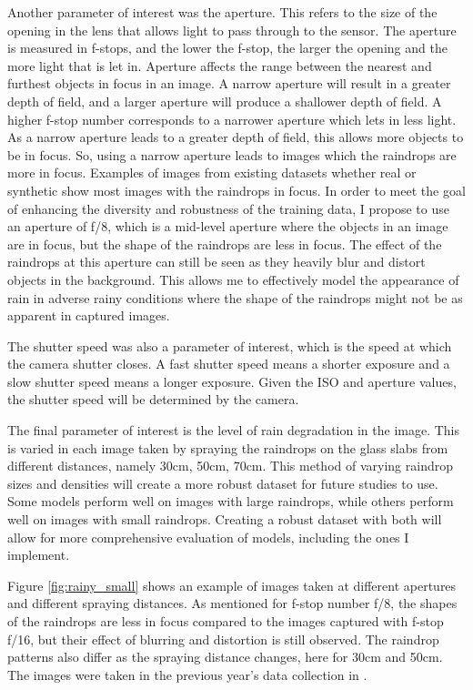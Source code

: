 \documentclass[11pt]{ociamthesis}  %
\begin{document}
Another parameter of interest was the aperture. This refers to the size of the opening in the lens that allows light to pass through to the sensor. The aperture is measured in f-stops, and the lower the f-stop, the larger the opening and the more light that is let in. Aperture affects the range between the nearest and furthest objects in focus in an image. A narrow aperture will result in a greater depth of field, and a larger aperture will produce a shallower depth of field. A higher f-stop number corresponds to a narrower aperture which lets in less light. As a narrow aperture leads to a greater depth of field, this allows more objects to be in focus. So, using a narrow aperture leads to images which the raindrops are more in focus. Examples of images from existing datasets whether real or synthetic show most images with the raindrops in focus. In order to meet the goal of enhancing the diversity and robustness of the training data, I propose to use an aperture of f/8, which is a mid-level aperture where the objects in an image are in focus, but the shape of the raindrops are less in focus. The effect of the raindrops at this aperture can still be seen as they heavily blur and distort objects in the background. This allows me to effectively model the appearance of rain in adverse rainy conditions where the shape of the raindrops might not be as apparent in captured images.

The shutter speed was also a parameter of interest, which is the speed at which the camera shutter closes. A fast shutter speed means a shorter exposure and a slow shutter speed means a longer exposure. Given the ISO and aperture values, the shutter speed will be determined by the camera.

The final parameter of interest is the level of rain degradation in the image. This is varied in each image taken by spraying the raindrops on the glass slabs from different distances, namely 30cm, 50cm, 70cm. This method of varying raindrop sizes and densities will create a more robust dataset for future studies to use. Some models perform well on images with large raindrops, while others perform well on images with small raindrops. Creating a robust dataset with both will allow for more comprehensive evaluation of models, including the ones I implement. 

Figure \ref{fig:rainy_small} shows an example of images taken at different apertures and different spraying distances. As mentioned for f-stop number f/8, the shapes of the raindrops are less in focus compared to the images captured with f-stop f/16, but their effect of blurring and distortion is still observed. The raindrop patterns also differ as the spraying distance changes, here for 30cm and 50cm. The images were taken in the previous year's data collection in \cite{Parmeet_Report}.
\end{document}
